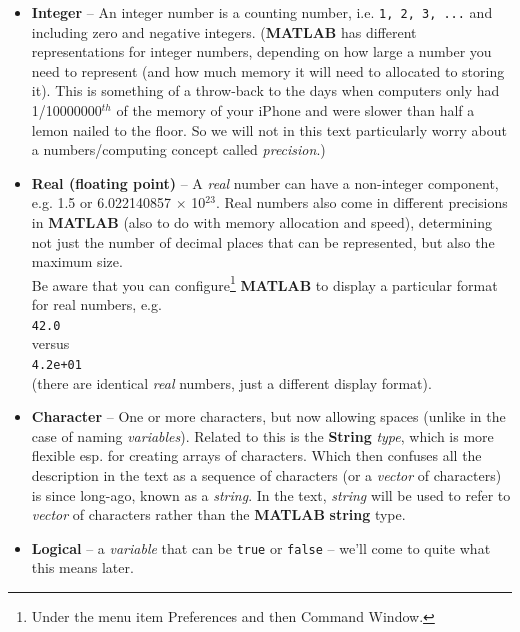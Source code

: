 \documentclass{tufte-book} %
\begin{document}
\begin{itemize}
\setlength{\itemindent}{.2in}

\item \textbf{Integer} -- An integer number is a counting number, i.e. \texttt{1, 2, 3, ...} and including zero and negative integers.
(\textbf{MATLAB} has different representations for integer numbers, depending on how large a number you need to represent (and how much memory it will need to allocated to storing it). This is something of a throw-back to the days when computers only had 1/10000000\(^{th}\) of the memory of your iPhone and were slower than half a lemon nailed to the floor. So we will not in this text particularly worry about a numbers/computing concept called \textit{precision}.)

\item \textbf{Real (floating point)} -- A \textit{real} number can have a non-integer component, e.g. 1.5 or 6.022140857 \(\times\) 10\(^{23}\). Real numbers also come in different precisions in \textbf{MATLAB} (also to do with memory allocation and speed), determining not just the number of decimal places that can be represented, but also the maximum size.
\\Be aware that you can configure\footnote{Under the menu item \textsf{Preferences} and then \textsf{Command Window}.} \textbf{MATLAB} to display a particular format for real numbers, e.g.
\\\texttt{42.0}
\\versus
\\\texttt{4.2e+01}
\\(there are identical \textit{real} numbers, just a different display format).

\item \textbf{Character} -- One or more characters, but now allowing spaces (unlike in the case of naming \textit{variables}).
Related to this is the \textbf{String} \textit{type}, which is more flexible esp. for creating arrays of characters. Which then confuses all the description in the text as a sequence of characters (or a \textit{vector} of characters) is since long-ago, known as a \textit{string}. In the text, \textit{string} will be used to refer to \textit{vector} of characters rather than the \textbf{MATLAB} \textbf{string} type. 

\item \textbf{Logical} -- a \textit{variable} that can be \texttt{true} or \texttt{false} -- we'll come to quite what this means later.


\end{itemize}
\end{document}
